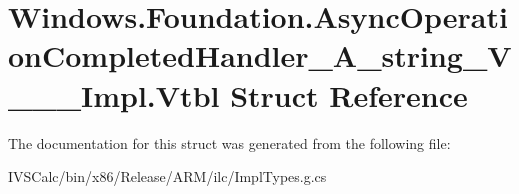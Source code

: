 \hypertarget{struct_windows_1_1_foundation_1_1_async_operation_completed_handler___a__string___v_______impl_1_1_vtbl}{}\section{Windows.\+Foundation.\+Async\+Operation\+Completed\+Handler\+\_\+\+A\+\_\+string\+\_\+\+V\+\_\+\+\_\+\+\_\+\+Impl.\+Vtbl Struct Reference}
\label{struct_windows_1_1_foundation_1_1_async_operation_completed_handler___a__string___v_______impl_1_1_vtbl}


The documentation for this struct was generated from the following file\+:\begin{DoxyCompactItemize}
\item 
I\+V\+S\+Calc/bin/x86/\+Release/\+A\+R\+M/ilc/Impl\+Types.\+g.\+cs\end{DoxyCompactItemize}
